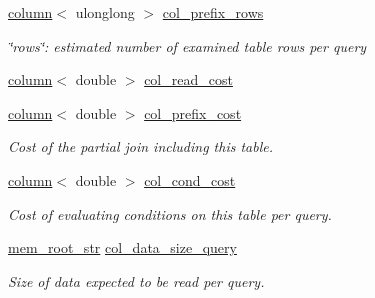 \begin{DoxyCompactItemize}
\mbox{\label{classqep__row_a881060f513bcbf3f1621b42f903fe2b4}} 
\mbox{\hyperlink{structqep__row_1_1column}{column}}$<$ ulonglong $>$ \mbox{\hyperlink{classqep__row_a881060f513bcbf3f1621b42f903fe2b4}{col\+\_\+prefix\+\_\+rows}}
\begin{DoxyCompactList}\small\item\em \char`\"{}rows\char`\"{}\+: estimated number of examined table rows per query \end{DoxyCompactList}\item 
\mbox{\hyperlink{structqep__row_1_1column}{column}}$<$ double $>$ \mbox{\hyperlink{classqep__row_a5be22790c0dd7c9f0e5a23f0f9455533}{col\+\_\+read\+\_\+cost}}
\item 
\mbox{\label{classqep__row_a47e5dc6c3e384661eab4700fea801685}} 
\mbox{\hyperlink{structqep__row_1_1column}{column}}$<$ double $>$ \mbox{\hyperlink{classqep__row_a47e5dc6c3e384661eab4700fea801685}{col\+\_\+prefix\+\_\+cost}}
\begin{DoxyCompactList}\small\item\em Cost of the partial join including this table. \end{DoxyCompactList}\item 
\mbox{\label{classqep__row_adbfe9e7234dee428a1dbffa64912cf61}} 
\mbox{\hyperlink{structqep__row_1_1column}{column}}$<$ double $>$ \mbox{\hyperlink{classqep__row_adbfe9e7234dee428a1dbffa64912cf61}{col\+\_\+cond\+\_\+cost}}
\begin{DoxyCompactList}\small\item\em Cost of evaluating conditions on this table per query. \end{DoxyCompactList}\item 
\mbox{\label{classqep__row_af9f9662c4dff310cbccbddcfa208b7a9}} 
\mbox{\hyperlink{structqep__row_1_1mem__root__str}{mem\+\_\+root\+\_\+str}} \mbox{\hyperlink{classqep__row_af9f9662c4dff310cbccbddcfa208b7a9}{col\+\_\+data\+\_\+size\+\_\+query}}
\begin{DoxyCompactList}\small\item\em Size of data expected to be read per query. \end{DoxyCompactList}\item 
\mbox{\label{classqep__row_a74083e1ff0f37e1710848d57340c0520}} 

\end{DoxyCompactItemize}

